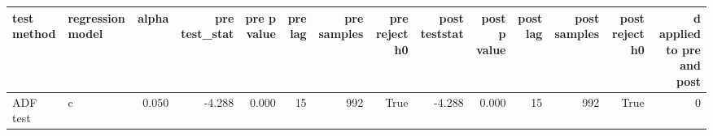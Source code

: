 \begin{tabular}{llrrrrrrrrrrrr}
\toprule
test method & regression model & alpha & pre test\_stat & pre p value & pre lag & pre samples & pre reject h0 & post teststat & post p value & post lag & post samples & post reject h0 & d applied to pre and post \\
\midrule
ADF test & c & 0.050 & -4.288 & 0.000 & 15 & 992 & True & -4.288 & 0.000 & 15 & 992 & True & 0 \\
\bottomrule
\end{tabular}
